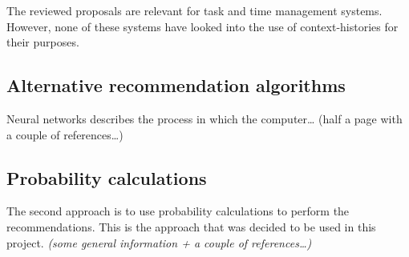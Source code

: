 The reviewed proposals are relevant for task and time management systems. However, none of these systems have looked into the use of context-histories for their purposes.




\subsection{Alternative recommendation algorithms}
Neural networks describes the process in which the computer\ldots
(half a page with a couple of references\ldots)

\subsection{Probability calculations}
The second approach is to use probability calculations to perform the recommendations. This is the approach that was decided to be used in this project. \emph{\color{red}(some general information + a couple of references\ldots)}
